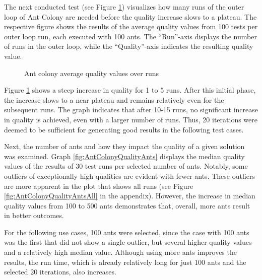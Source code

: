 The next conducted test (see Figure \ref{fig:AntColonyQualityRuns}) visualizes how many runs of the outer loop of Ant Colony are needed before the quality increase slows to a plateau. 
The respective figure shows the results of the average quality values from 100 tests per outer loop run, each executed with 100 ants. 
The \enquote{Run}-axis displays the number of runs in the outer loop, while the \enquote{Quality}-axis indicates the resulting quality value.


\begin{figure}
	\centering
	
	\caption{Ant colony average quality values over runs}
	\label{fig:AntColonyQualityRuns}
\end{figure}

%	

Figure \ref{fig:AntColonyQualityRuns} shows a steep increase in quality for 1 to 5 runs.
After this initial phase, the increase slows to a near plateau and remains relatively even for the subsequent runs. 
The graph indicates that after 10-15 runs, no significant increase in quality is achieved, even with a larger number of runs. 
Thus, 20 iterations were deemed to be sufficient for generating good results in the following test cases.


Next, the number of ants and how they impact the quality of a given solution was examined. 
Graph \ref{fig:AntColonyQualityAnts} displays the median quality values of the results of 30 test runs per selected number of ants.
Notably, some outliers of exceptionally high qualities are evident with fewer ants. 
These outliers are more apparent in the plot that shows all runs (see Figure \ref{fig:AntColonyQualityAntsAll} in the appendix).
However, the increase in median quality values from 100 to 500 ants demonstrates that, overall, more ants result in better outcomes.

For the following use cases, 100 ants were selected, since the case with 100 ants was the first that did not show a single outlier, but several higher quality values and a relatively high median value. 
Although using more ants improves the results, the run time, which is already relatively long for just 100 ants and the selected 20 iterations, also increases. 

